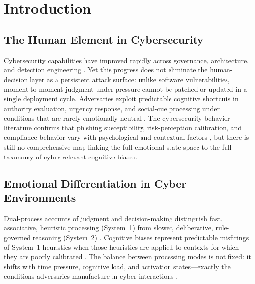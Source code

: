 \documentclass[12pt,a4paper]{article}
\begin{document}
\begin{titlepage}
\begin{center}
\begin{minipage}{0.92\textwidth}
\end{minipage}
\end{center}
\end{titlepage}

\clearpage
\setcounter{page}{1}

\section{Introduction}

\subsection{The Human Element in Cybersecurity}

Cybersecurity capabilities have improved rapidly across governance, architecture, and detection engineering \citep{verizon2025dbir, nistcsf2024}. Yet this progress does not eliminate the human-decision layer as a persistent attack surface: unlike software vulnerabilities, moment-to-moment judgment under pressure cannot be patched or updated in a single deployment cycle. Adversaries exploit predictable cognitive shortcuts in authority evaluation, urgency response, and social-cue processing under conditions that are rarely emotionally neutral \citep{workman2008wisecrackers, heartfield2016semantic, stajano2011scam, pfleeger2012leveraging}. The cybersecurity-behavior literature confirms that phishing susceptibility, risk-perception calibration, and compliance behavior vary with psychological and contextual factors \citep{alsharida2023human, althobaiti2024phishing, hadlington2017human}, but there is still no comprehensive map linking the full emotional-state space to the full taxonomy of cyber-relevant cognitive biases.

\subsection{Emotional Differentiation in Cyber Environments}

Dual-process accounts of judgment and decision-making distinguish fast, associative, heuristic processing (System~1) from slower, deliberative, rule-governed reasoning (System~2) \citep{kahneman2011thinking, evans2008dual, stanovich2000individual}. Cognitive biases represent predictable misfirings of System~1 heuristics when those heuristics are applied to contexts for which they are poorly calibrated \citep{tversky1974judgment}. The balance between processing modes is not fixed: it shifts with time pressure, cognitive load, and activation states---exactly the conditions adversaries manufacture in cyber interactions \citep{buckley2023employee, frank2022contextual, hadlington2017human}.
\end{document}
